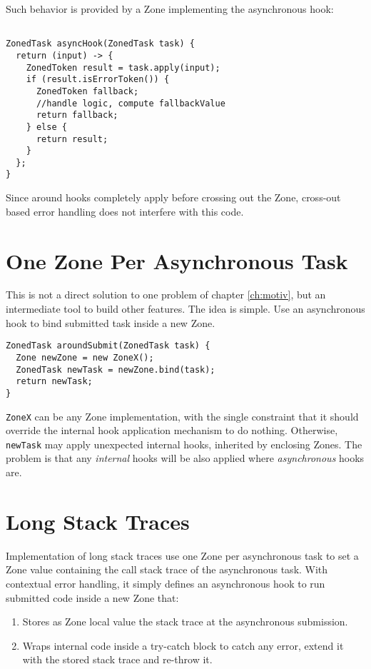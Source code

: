 Such behavior is provided by a Zone implementing the asynchronous hook:

\begin{lstlisting}

ZonedTask asyncHook(ZonedTask task) {
  return (input) -> {
    ZonedToken result = task.apply(input);
    if (result.isErrorToken()) {
      ZonedToken fallback;
      //handle logic, compute fallbackValue
      return fallback;
    } else {
      return result;
    }
  };
}
\end{lstlisting}

Since around hooks completely apply before crossing out the Zone, cross-out based error handling does not interfere with this code.

\section{One Zone Per Asynchronous Task}

This is not a direct solution to one problem of chapter \ref{ch:motiv}, but an intermediate tool to build other features. The idea is simple. Use an asynchronous hook to bind submitted task inside a new Zone.

\begin{lstlisting}
ZonedTask aroundSubmit(ZonedTask task) {
  Zone newZone = new ZoneX();
  ZonedTask newTask = newZone.bind(task);
  return newTask;
}
\end{lstlisting}

\lstinline{ZoneX} can be any Zone implementation, with the single constraint that it should override the internal hook application mechanism to do nothing. Otherwise, \lstinline{newTask} may apply unexpected internal hooks, inherited by enclosing Zones. The problem is that any \emph{internal} hooks will be also applied where \emph{asynchronous} hooks are.

\section{Long Stack Traces}

Implementation of long stack traces use one Zone per asynchronous task to set a Zone value containing the call stack trace of the asynchronous task. With contextual error handling, it simply defines an asynchronous hook to run submitted code inside a new Zone that:
\begin{enumerate}
\item Stores as Zone local value the stack trace at the asynchronous submission.
\item Wraps internal code inside a try-catch block to catch any error, extend it with the stored stack trace and re-throw it.
\end{enumerate}

